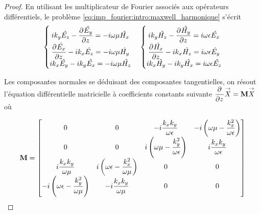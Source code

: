     \begin{proof}
        En utilisant les multiplicateur de Fourier associés aux opérateurs différentiels, le problème \eqref{eq:imp_fourier:intro:maxwell_harmonique} s'écrit
        \begin{align*}
            \left\lbrace
            \begin{matrix}
            ik_y \hat{E_z}  - \ddr{z}{\hat{E_y}} = -i \w \mu \hat{H_x} \\
            \ddr{z}{\hat{E_x}} - ik_x \hat{E_z} = -i\w \mu \hat{H_y} \\
            ik_x \hat{E_y} - ik_y \hat{E_x} = -i\w \mu \hat{H_z} \\
            \end{matrix}
            \right. \quad
            \left\lbrace
            \begin{matrix}
            ik_y \hat{H_z}  - \ddr{z}{\hat{H_y}} = i \w \eps \hat{E_x} \\
            \ddr{z}{\hat{H_x}} - ik_x \hat{H_z} = i\w \eps \hat{E_y} \\
            ik_x \hat{H_y} - ik_y \hat{H_x} = i\w \eps \hat{E_z} \\
            \end{matrix}
            \right.
        \end{align*}

        Les composantes normales se déduisant des composantes tangentielles, on résout l'équation différentielle  matricielle à coefficients constants
        suivante \(\ddr{z}{}\vect{X} = \mat{M} \vect{X}\) où

        \begin{equation}
            \mat{M} = \begin{bmatrix}
            0 & 0 & -i\frac{k_xk_y}{\w\eps} & -i\left(\w\mu - \frac{k_x^2}{\w\eps}\right)\\
            0 & 0 & i\left(\w\mu - \frac{k_y^2}{\w\eps}\right) & i\frac{k_xk_y}{\w\eps}\\
            i\frac{k_xk_y}{\w\mu} & i\left(\w\eps - \frac{k_x^2}{\w\mu}\right) & 0 & 0 \\
            -i\left(\w\eps - \frac{k_y^2}{\w\mu}\right) & -i\frac{k_xk_y}{\w\mu} & 0 & 0 \\
            \end{bmatrix}
        \end{equation}
    \end{proof}

